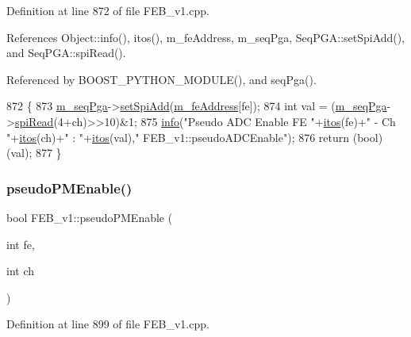 Definition at line 872 of file F\+E\+B\+\_\+v1.\+cpp.



References Object\+::info(), itos(), m\+\_\+fe\+Address, m\+\_\+seq\+Pga, Seq\+P\+G\+A\+::set\+Spi\+Add(), and Seq\+P\+G\+A\+::spi\+Read().



Referenced by B\+O\+O\+S\+T\+\_\+\+P\+Y\+T\+H\+O\+N\+\_\+\+M\+O\+D\+U\+L\+E(), and seq\+Pga().


\begin{DoxyCode}
872                                              \{
873   \hyperlink{classFEB__v1_a6c7804ac86796f233a8393043adf2e77}{m\_seqPga}->\hyperlink{classSeqPGA_ac998ce3a6d9b5f2e88cc8393f8c1df53}{setSpiAdd}(\hyperlink{classFEB__v1_a4e1945c2d5b434125f375e9d0fc6d99f}{m\_feAddress}[fe]);
874   \textcolor{keywordtype}{int} val = (\hyperlink{classFEB__v1_a6c7804ac86796f233a8393043adf2e77}{m\_seqPga}->\hyperlink{classSeqPGA_ab3d0e5e5d4014bc7a92588a76b8713d4}{spiRead}(4+ch)>>10)&1;
875   \hyperlink{classObject_a644fd329ea4cb85f54fa6846484b84a8}{info}(\textcolor{stringliteral}{"Pseudo ADC Enable FE "}+\hyperlink{Tools_8h_af330027dbdafb9a30768b3613c553e60}{itos}(fe)+\textcolor{stringliteral}{" - Ch "}+\hyperlink{Tools_8h_af330027dbdafb9a30768b3613c553e60}{itos}(ch)+\textcolor{stringliteral}{" : "}+\hyperlink{Tools_8h_af330027dbdafb9a30768b3613c553e60}{itos}(val),\textcolor{stringliteral}{"
      FEB\_v1::pseudoADCEnable"});
876   \textcolor{keywordflow}{return} (\textcolor{keywordtype}{bool})(val);
877 \}
\end{DoxyCode}
\mbox{\label{classFEB__v1_ab6b076d6e1372bfa8d9fd2916b1b52cd}} 
\subsubsection{\texorpdfstring{pseudo\+P\+M\+Enable()}{pseudoPMEnable()}}
{\footnotesize\ttfamily bool F\+E\+B\+\_\+v1\+::pseudo\+P\+M\+Enable (\begin{DoxyParamCaption}\item[{int}]{fe,  }\item[{int}]{ch }\end{DoxyParamCaption})}



Definition at line 899 of file F\+E\+B\+\_\+v1.\+cpp.



